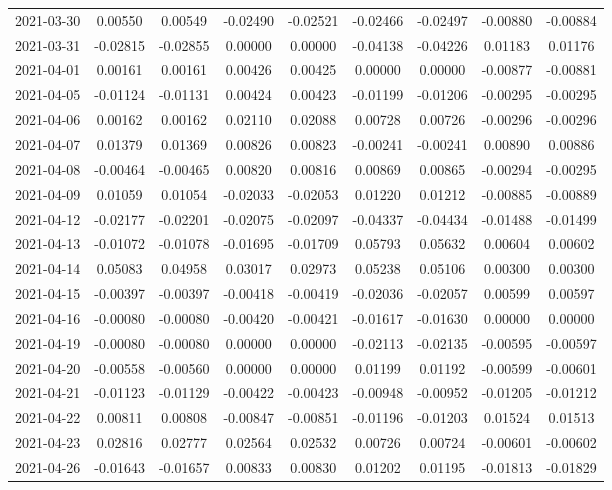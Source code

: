\begin{footnotesize}
\begin{longtable}{lcccccccc}
2021-03-30 & 0.00550 & 0.00549 & -0.02490 & -0.02521 & -0.02466 & -0.02497 & -0.00880 & -0.00884 \\
2021-03-31 & -0.02815 & -0.02855 & 0.00000 & 0.00000 & -0.04138 & -0.04226 & 0.01183 & 0.01176 \\
2021-04-01 & 0.00161 & 0.00161 & 0.00426 & 0.00425 & 0.00000 & 0.00000 & -0.00877 & -0.00881 \\
2021-04-05 & -0.01124 & -0.01131 & 0.00424 & 0.00423 & -0.01199 & -0.01206 & -0.00295 & -0.00295 \\
2021-04-06 & 0.00162 & 0.00162 & 0.02110 & 0.02088 & 0.00728 & 0.00726 & -0.00296 & -0.00296 \\
2021-04-07 & 0.01379 & 0.01369 & 0.00826 & 0.00823 & -0.00241 & -0.00241 & 0.00890 & 0.00886 \\
2021-04-08 & -0.00464 & -0.00465 & 0.00820 & 0.00816 & 0.00869 & 0.00865 & -0.00294 & -0.00295 \\
2021-04-09 & 0.01059 & 0.01054 & -0.02033 & -0.02053 & 0.01220 & 0.01212 & -0.00885 & -0.00889 \\
2021-04-12 & -0.02177 & -0.02201 & -0.02075 & -0.02097 & -0.04337 & -0.04434 & -0.01488 & -0.01499 \\
2021-04-13 & -0.01072 & -0.01078 & -0.01695 & -0.01709 & 0.05793 & 0.05632 & 0.00604 & 0.00602 \\
2021-04-14 & 0.05083 & 0.04958 & 0.03017 & 0.02973 & 0.05238 & 0.05106 & 0.00300 & 0.00300 \\
2021-04-15 & -0.00397 & -0.00397 & -0.00418 & -0.00419 & -0.02036 & -0.02057 & 0.00599 & 0.00597 \\
2021-04-16 & -0.00080 & -0.00080 & -0.00420 & -0.00421 & -0.01617 & -0.01630 & 0.00000 & 0.00000 \\
2021-04-19 & -0.00080 & -0.00080 & 0.00000 & 0.00000 & -0.02113 & -0.02135 & -0.00595 & -0.00597 \\
2021-04-20 & -0.00558 & -0.00560 & 0.00000 & 0.00000 & 0.01199 & 0.01192 & -0.00599 & -0.00601 \\
2021-04-21 & -0.01123 & -0.01129 & -0.00422 & -0.00423 & -0.00948 & -0.00952 & -0.01205 & -0.01212 \\
2021-04-22 & 0.00811 & 0.00808 & -0.00847 & -0.00851 & -0.01196 & -0.01203 & 0.01524 & 0.01513 \\
2021-04-23 & 0.02816 & 0.02777 & 0.02564 & 0.02532 & 0.00726 & 0.00724 & -0.00601 & -0.00602 \\
2021-04-26 & -0.01643 & -0.01657 & 0.00833 & 0.00830 & 0.01202 & 0.01195 & -0.01813 & -0.01829 \\

\end{longtable}
\end{footnotesize}
